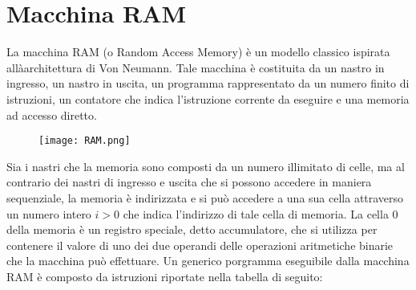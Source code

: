   \section{Macchina RAM}
  La macchina RAM (o Random Access Memory) è un modello classico ispirata allàarchitettura di Von Neumann. Tale macchina è costituita da un nastro in ingresso, un nastro in uscita, un programma rappresentato da un numero finito di istruzioni, un contatore che indica l'istruzione corrente da eseguire e una memoria ad accesso diretto.

  \begin{figure}[h]
    \texttt{[image: RAM.png]}
  \end{figure}

  Sia i nastri che la memoria sono composti da un numero illimitato di celle, ma al contrario dei nastri di ingresso e uscita che si possono accedere in maniera sequenziale, la memoria è indirizzata e si può accedere a una sua cella attraverso un numero intero \(i>0\) che indica l'indirizzo di tale cella di memoria. La cella 0 della memoria è un registro speciale, detto accumulatore, che si utilizza per contenere il valore di uno dei due operandi delle operazioni aritmetiche binarie che la macchina può effettuare. Un generico porgramma eseguibile dalla macchina RAM è composto da istruzioni riportate nella tabella di seguito:

